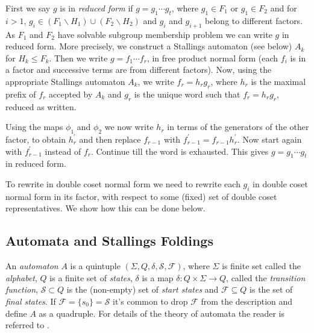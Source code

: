 \documentclass[a4paper,12pt]{article}
\renewcommand{\d}{\delta }
\renewcommand{\S}{\Sigma }
\numberwithin{equation}{section}
\numberwithin{figure}{section}
\newcommand{\maps}{\rightarrow}
\begin{document}
First we say $g$ is in \emph{reduced form} if $g = g_1 \cdots g_t$, where
$g_1 \in F_1$ or $g_1 \in F_2$ and
for
$i > 1$,    $g_i \in (F_1 \backslash H_1)\cup (F_2\backslash H_2)$ and  $g_i$
and  ${g_{i+1}}$ belong to  different factors. As $F_1$ and
$F_2$ have solvable subgroup membership problem we can write $g$ in
reduced form. More precisely, we construct a Stallings automaton
(see below) $A_k$ for
$H_k\le F_k$. %
Then we write $g=f_1\cdots f_r$, in free product normal
form (each $f_i$ is in a factor and successive terms are
from different factors).
Now,
using the appropriate Stallings automaton $A_k$, we write $f_r=h_rg_r$, where
$h_r$ is the maximal prefix of $f_r$ accepted by $A_k$ and $g_r$ is
 the
unique word such that $f_r=h_rg_r$, reduced as written.

Using the maps $\phi_1$ and $\phi_2$ we now write $h_r$ in terms of the
generators of the other factor, to obtain $h^\prime_r$ and then
replace $f_{r-1}$ with $f_{r-1}^\prime=f_{r-1}h^\prime_r$. Now start again with
$f_{r-1}^\prime$ instead of $f_r$. Continue till the word is exhausted.
This gives $g=g_1\cdots g_t$ in reduced form.

To rewrite in double coset normal form we need to
 rewrite
each $g_i$ in double coset normal form in its factor, with respect
to some (fixed) set of double coset representatives. We show how
this can be done below.

\subsection{Automata and Stallings Foldings}\label{sub:foldings}

An {\em automaton} $A$ is  a quintuple
$(\S,Q,\d,\mathcal{S},\mathcal{F})$, where $\S$ is finite set
called the {\em alphabet}, $Q$ is a finite set of {\em states},
$\d$ is a map $\d:Q\times \S\maps Q$, called the {\em transition
function}, $\mathcal{S}\subset Q$ is the (non-empty) set of {\em
start states} and $\mathcal{F}\subseteq Q$ is the set of {\em
final states}.  If
$\mathcal{F}=\{s_0\}=\mathcal{S}$ it's common to drop
$\mathcal{F}$ from the description and define $A$ as a quadruple.
For details of the theory of automata the reader is referred to 
 \cite{Lawson04}.
 
\end{document}
